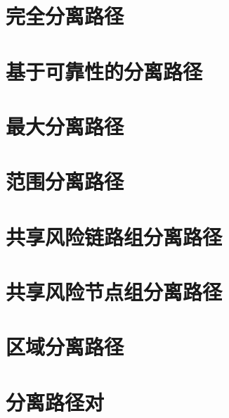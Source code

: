\section{完全分离路径}
\section{基于可靠性的分离路径}
\section{最大分离路径}
\section{范围分离路径}
\section{共享风险链路组分离路径}
\section{共享风险节点组分离路径}
\section{区域分离路径}
\section{分离路径对}
